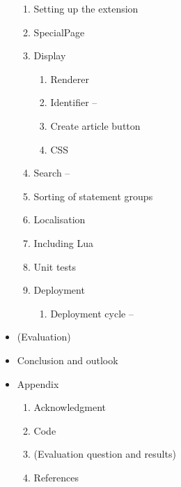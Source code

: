 \documentclass[11pt]{article}
\begin{document}
\begin{itemize}
  \begin{enumerate}
	\item Setting up the extension
   \item SpecialPage
   \item Display
   \begin{enumerate}
	\item Renderer
	\item Identifier --
    \item Create article button
    \item CSS
   \end{enumerate}
    \item Search --
    \item Sorting of statement groups
    \item Localisation
   \item Including Lua
    \item Unit tests
   \item Deployment
   \begin{enumerate}
    \item Deployment cycle --
   \end{enumerate}
  \end{enumerate}
  \item (Evaluation)
  \item Conclusion and outlook
  \item Appendix
  \begin{enumerate}
	  \item Acknowledgment
	  \item Code
	  \item (Evaluation question and results)
	  \item References
  \end{enumerate}
\end{itemize}
\end{document}
